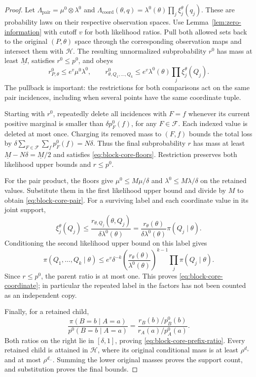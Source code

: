 \begin{proof}
Let
$\Lambda_{\mathrm{pair}}=\mu^0\otimes\lambda^0$ and
$\Lambda_{\mathrm{coord}}(\theta,q)
 =\lambda^0(\theta)\prod_j\xi_j^\theta(q_j)$.
These are probability laws on their respective observation spaces.
Use Lemma~\ref{lem:zero-information} with cutoff $v$ for both
likelihood ratios.  Pull both allowed sets back to the original
$(P,\theta)$ space through the corresponding observation maps and
intersect them with $\mathcal H$.  The resulting unnormalized
subprobability $r^0$ has mass at least $\underline M$, satisfies
$r^0\le p^0$, and obeys
\[
 r^0_{P,\theta}\le e^v\mu^0\lambda^0,\qquad
 r^0_{\theta,Q_1,\ldots,Q_k}
       \le e^v\lambda^0(\theta)\prod_j\xi_j^\theta(Q_j).
\]
The pullback is important: the restrictions for both comparisons
act on the same pair incidences, including when several points have
the same coordinate tuple.

Starting with $r^0$, repeatedly delete all incidences with $F=f$
whenever its current positive marginal is smaller than
$\delta p^0_F(f)$, for any $F\in\mathcal F$.  Each indexed value is
deleted at most once.  Charging its removed mass to $(F,f)$ bounds
the total loss by
$\delta\sum_{F\in\mathcal F}\sum_f p^0_F(f)=N\delta$.
Thus the final subprobability $r$ has mass at least
$\underline M-N\delta=\underline M/2$ and satisfies
\eqref{eq:block-core-floors}.  Restriction preserves both likelihood
upper bounds and $r\le p^0$.

For the pair product, the floors give
$\mu^0\le M\mu/\delta$ and
$\lambda^0\le M\lambda/\delta$ on the retained values.
Substitute them in the first likelihood upper bound and divide by
$M$ to obtain \eqref{eq:block-core-pair}.
For a surviving label and each coordinate value in its joint support,
\[
 \xi_j^\theta(Q_j)
 \le \frac{r_{\theta,Q_j}(\theta,Q_j)}
          {\delta\lambda^0(\theta)}
 =\frac{r_\theta(\theta)}{\delta\lambda^0(\theta)}
       \pi(Q_j\mid\theta).
\]
Conditioning the second likelihood upper bound on this label gives
\[
 \pi(Q_1,\ldots,Q_k\mid\theta)
 \le e^v\delta^{-k}
       \left(\frac{r_\theta(\theta)}{\lambda^0(\theta)}\right)^{k-1}
       \prod_j\pi(Q_j\mid\theta).
\]
Since $r\le p^0$, the parent ratio is at most one.  This proves
\eqref{eq:block-core-coordinate}; in particular the repeated label
in the factors has not been counted as an independent copy.

Finally, for a retained child,
\[
 \frac{\pi(B=b\mid A=a)}{p^0(B=b\mid A=a)}
 =\frac{r_B(b)/p^0_B(b)}{r_A(a)/p^0_A(a)}.
\]
Both ratios on the right lie in $[\delta,1]$, proving
\eqref{eq:block-core-prefix-ratio}.  Every retained child is
attained in $\mathcal H$, where its original conditional mass is
at least $\rho^{d_+}$ and at most $\rho^{d_-}$.  Summing the lower
original masses proves the support count, and substitution proves
the final bounds.
\end{proof}

